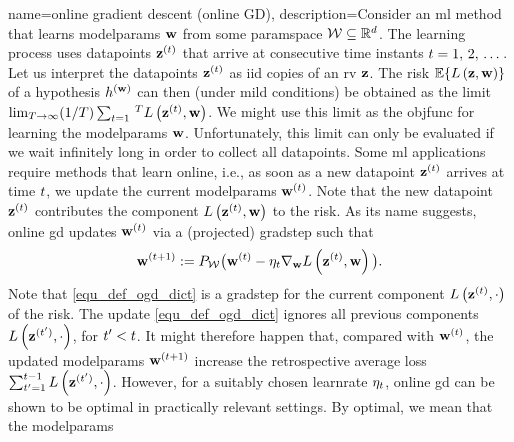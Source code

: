 {name={online gradient descent (online GD)}, 
	description={Consider  an \gls{ml} method that learns \glspl{modelparam} 
		${\bf w}$ from some \gls{paramspace} $\mathcal{W} \subseteq \mathbb{R}^{d}$. 
		The learning process uses \glspl{datapoint} ${\bf z}^{(t)}$ that arrive at consecutive time instants $t=1, \,2, \,\dots$. 
		Let us interpret the \glspl{datapoint} ${\bf z}^{(t)}$ as \gls{iid} copies 
		of an \gls{rv} ${\bf z}$. The \gls{risk} $\mathbb{E}\{ L\left({\bf z},{\bf w} \right) \}$ of a 
		\gls{hypothesis} $h^{({\bf w})}$ can then (under mild conditions) be obtained as the limit 
		$\lim_{T\rightarrow \infty} (1/T)\sum_{t=1}\,^{T} L\left({\bf z}^{(t)},{\bf w} \right)$. 
		We might use this limit as the \gls{objfunc} for learning the \glspl{modelparam} ${\bf w}$. 
		Unfortunately, this limit can only be evaluated if we wait infinitely long in order to collect all \glspl{datapoint}. 
		Some \gls{ml} applications require methods that learn online, i.e., as soon as a new \gls{datapoint} ${\bf z}^{(t)}$ 
		arrives at time $t$, we update the current \glspl{modelparam} ${\bf w}^{(t)}$. Note that 
		the new \gls{datapoint} ${\bf z}^{(t)}$ contributes the component $L\left({\bf z}^{(t)},{\bf w} \right)$ 
		to the \gls{risk}. As its name suggests, online \gls{gd} updates ${\bf w}^{(t)}$ via a (projected) \gls{gradstep} such that
		\begin{equation} 
			\label{equ_def_ogd_dict}
 			{\bf w}^{(t+1)} := P_{\mathcal{W}}\big( {\bf w}^{(t)} - \eta_{t} \nabla_{{\bf w}} L\left({\bf z}^{(t)},{\bf w} \right)\big). 
		\end{equation} 
		Note that \eqref{equ_def_ogd_dict} is a \gls{gradstep} for the current component $L\left({\bf z}^{(t)},\cdot \right)$ 
		of the \gls{risk}. The update \eqref{equ_def_ogd_dict} ignores all previous components $L\left({\bf z}^{(t')},\cdot \right)$, 
		for $t' < t$. It might therefore happen that, compared with ${\bf w}^{(t)}$, the updated \glspl{modelparam} 
		${\bf w}^{(t+1)}$ increase the retrospective average \gls{loss} $\sum_{t'=1}^{t-1} L\left({\bf z}^{(t')},\cdot \right)$. 
		However, for a suitably chosen \gls{learnrate} $\eta_{t}$, online \gls{gd} can be shown 
		to be optimal in practically relevant settings. By optimal, we mean that the \glspl{modelparam} 
}}
